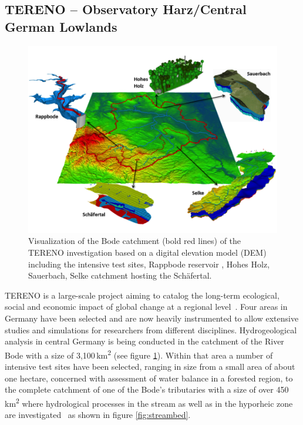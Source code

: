 \documentclass[twocolumn]{svjour3}          %
\begin{document}
\subsection{TERENO -- Observatory Harz/Central German Lowlands}\label{tereno-bode}

\begin{figure}[htb]
  \includegraphics[width=\linewidth]{images/tereno.png}
\caption{Visualization of the Bode catchment (bold red lines) of the TERENO investigation based on a digital elevation model (DEM) including the intensive test sites, Rappbode reservoir \cite{rinke:ees}, Hohes Holz, Sauerbach, Selke catchment hosting the Sch\"afertal.}
\label{fig:tereno}
\end{figure}

TERENO is a large-scale project aiming to catalog the long-term ecological, social and economic impact of global change at a regional level~\cite{zacharias:tereno}. Four areas in Germany have been selected and are now heavily instrumented to allow extensive studies and simulations for researchers from different disciplines. Hydrogeological analysis in central Germany is being conducted in the catchment of the River Bode with a size of 3,100\,km\textsuperscript{2} (see figure \ref{fig:tereno}). Within that area a number of intensive test sites have been selected, ranging in size from a small area of about one hectare, concerned with assessment of water balance in a forested region, to the complete catchment of one of the Bode's tributaries with a size of over 450\,km\textsuperscript{2} where hydrological processes in the stream as well as in the hyporheic zone are investigated~\cite{schmidt:selke, trauth:flow} as shown in figure \ref{fig:streambed}.
\end{document}
